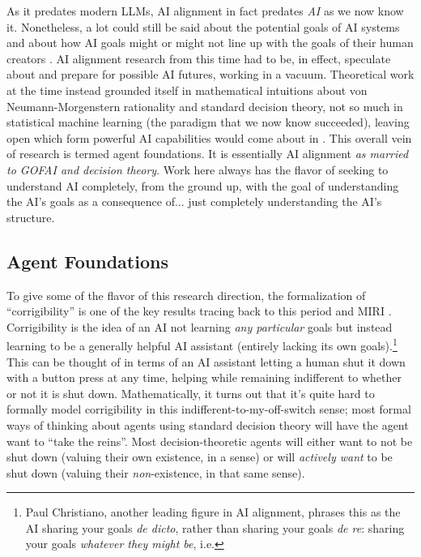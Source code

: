 As it predates modern LLMs, AI alignment in fact predates \emph{AI} as we now
know it. Nonetheless, a lot could still be said about the potential goals of AI
systems and about how AI goals might or might not line up with the goals of
their human creators
\cite{bostrom2014superintelligence,omohundro2008drives,yudkowsky2008factor}. AI
alignment research from this time had to be, in effect, speculate about and
prepare for possible AI futures, working in a vacuum. Theoretical work at the
time instead grounded itself in mathematical intuitions about von
Neumann-Morgenstern rationality \cite{von1944games} and standard decision
theory, not so much in statistical machine learning (the paradigm that we now
know succeeded), leaving open which form powerful AI capabilities would come
about in \cite{soares2015corrigibility}. This overall vein of research is
termed agent foundations. It is essentially AI alignment \emph{as married to
GOFAI and decision theory}. Work here always has the flavor of seeking to
understand AI completely, from the ground up, with the goal of understanding
the AI's goals as a consequence of... just completely understanding the AI's
structure.

\subsection{Agent Foundations}
To give some of the flavor of this research direction, the formalization of
``corrigibility'' is one of the key results tracing back to this period and
MIRI \cite{soares2015corrigibility}. Corrigibility is the idea of an AI not
learning \emph{any particular} goals but instead learning to be a generally
helpful AI assistant (entirely lacking its own goals).\footnote{Paul
Christiano, another leading figure in AI alignment, phrases this as the AI
sharing your goals \emph{de dicto}, rather than sharing your goals \emph{de
re}: sharing your goals \emph{whatever they might be}, i.e.} This can be
thought of in terms of an AI assistant letting a human shut it down with a
button press at any time, helping while remaining indifferent to whether or not
it is shut down. Mathematically, it turns out that it's quite hard to formally
model corrigibility in this indifferent-to-my-off-switch sense; most formal
ways of thinking about agents using standard decision theory will have the
agent want to ``take the reins''. Most decision-theoretic agents will either
want to not be shut down (valuing their own existence, in a sense) or will
\emph{actively want} to be shut down (valuing their \emph{non}-existence, in
that same sense).


